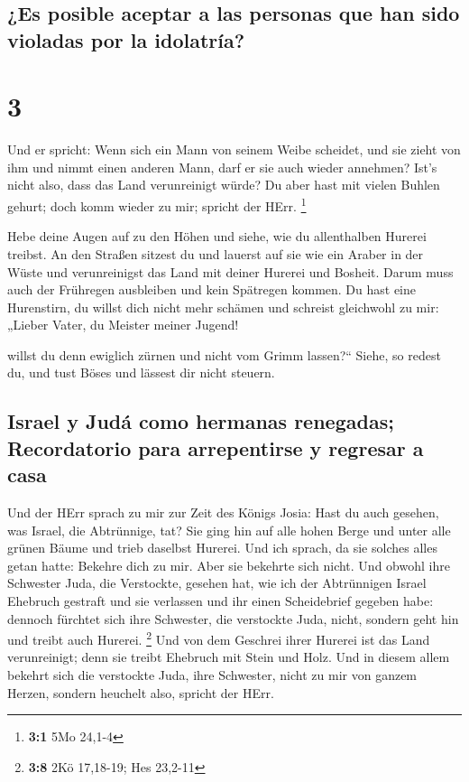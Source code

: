 \hypertarget{es-posible-aceptar-a-las-personas-que-han-sido-violadas-por-la-idolatruxeda}{%
\subsection{¿Es posible aceptar a las personas que han sido violadas por
la
idolatría?}\label{es-posible-aceptar-a-las-personas-que-han-sido-violadas-por-la-idolatruxeda}}

\hypertarget{section-2}{%
\section{3}\label{section-2}}

 Und er spricht: Wenn sich ein Mann von seinem Weibe
scheidet, und sie zieht von ihm und nimmt einen anderen Mann, darf er
sie auch wieder annehmen? Ist's nicht also, dass das Land verunreinigt
würde? Du aber hast mit vielen Buhlen gehurt; doch komm wieder zu mir;
spricht der HErr. \footnote{\textbf{3:1} 5Mo 24,1-4}

 Hebe deine Augen auf zu den Höhen und siehe, wie du
allenthalben Hurerei treibst. An den Straßen sitzest du und lauerst auf
sie wie ein Araber in der Wüste und verunreinigst das Land mit deiner
Hurerei und Bosheit.  Darum muss auch der Frühregen
ausbleiben und kein Spätregen kommen. Du hast eine Hurenstirn, du willst
dich nicht mehr schämen  und schreist gleichwohl zu mir:
„Lieber Vater, du Meister meiner Jugend!

 willst du denn ewiglich zürnen und nicht vom Grimm
lassen?{}`` Siehe, so redest du, und tust Böses und lässest dir nicht
steuern.

\hypertarget{israel-y-juduxe1-como-hermanas-renegadas-recordatorio-para-arrepentirse-y-regresar-a-casa}{%
\subsection{Israel y Judá como hermanas renegadas; Recordatorio para
arrepentirse y regresar a
casa}\label{israel-y-juduxe1-como-hermanas-renegadas-recordatorio-para-arrepentirse-y-regresar-a-casa}}

 Und der HErr sprach zu mir zur Zeit des Königs Josia:
Hast du auch gesehen, was Israel, die Abtrünnige, tat? Sie ging hin auf
alle hohen Berge und unter alle grünen Bäume und trieb daselbst Hurerei.
 Und ich sprach, da sie solches alles getan hatte: Bekehre
dich zu mir. Aber sie bekehrte sich nicht. Und obwohl ihre Schwester
Juda, die Verstockte, gesehen hat,  wie ich der
Abtrünnigen Israel Ehebruch gestraft und sie verlassen und ihr einen
Scheidebrief gegeben habe: dennoch fürchtet sich ihre Schwester, die
verstockte Juda, nicht, sondern geht hin und treibt auch Hurerei.
\footnote{\textbf{3:8} 2Kö 17,18-19; Hes 23,2-11}  Und von
dem Geschrei ihrer Hurerei ist das Land verunreinigt; denn sie treibt
Ehebruch mit Stein und Holz.  Und in diesem allem bekehrt
sich die verstockte Juda, ihre Schwester, nicht zu mir von ganzem
Herzen, sondern heuchelt also, spricht der HErr.

